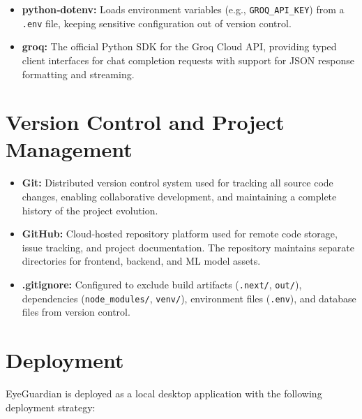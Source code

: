 \documentclass[12pt]{report}
\begin{document}
\begin{itemize}
    \item \textbf{python‑dotenv:} Loads environment variables (e.g., \texttt{GROQ\_API\_KEY}) from a \texttt{.env} file, keeping sensitive configuration out of version control.
    \item \textbf{groq:} The official Python SDK for the Groq Cloud API, providing typed client interfaces for chat completion requests with support for JSON response formatting and streaming.
\end{itemize}

\section{Version Control and Project Management}

\begin{itemize}
    \item \textbf{Git:} Distributed version control system used for tracking all source code changes, enabling collaborative development, and maintaining a complete history of the project evolution.
    \item \textbf{GitHub:} Cloud‑hosted repository platform used for remote code storage, issue tracking, and project documentation. The repository maintains separate directories for frontend, backend, and ML model assets.
    \item \textbf{.gitignore:} Configured to exclude build artifacts (\texttt{.next/}, \texttt{out/}), dependencies (\texttt{node\_modules/}, \texttt{venv/}), environment files (\texttt{.env}), and database files from version control.
\end{itemize}

\section{Deployment}

EyeGuardian is deployed as a local desktop application with the following deployment strategy:
\end{document}
